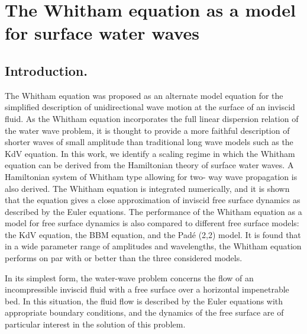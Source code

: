 \section{The Whitham equation as a model for surface water waves}
\subsection{Introduction.}
The Whitham equation was proposed as an alternate model equation for the simplified description of unidirectional 
wave motion at the surface of an inviscid fluid. As the Whitham equation incorporates the full
linear dispersion relation of the water wave problem, it is thought to provide a more faithful description
of shorter waves of small amplitude than traditional long wave models such as the KdV equation.
In this work, we identify a scaling regime in which the Whitham equation can be derived from the
Hamiltonian theory of surface water waves. A Hamiltonian system of Whitham type allowing for two-
way wave propagation is also derived. The Whitham equation is integrated numerically, and it is shown
that the equation gives a close approximation of inviscid free surface dynamics as described by the
Euler equations. The performance of the Whitham equation as a model for free surface dynamics is also
compared to different free surface models: the KdV equation, the BBM equation, and the Pad\'e (2,2) model.
It is found that in a wide parameter range of amplitudes and wavelengths, the Whitham equation performs
on par with or better than the three considered models.


In its simplest form, the water-wave problem concerns the
flow of an incompressible inviscid fluid with a free surface over
a horizontal impenetrable bed. In this situation, the fluid flow
is described by the Euler equations with appropriate boundary
conditions, and the dynamics of the free surface are of particular
interest in the solution of this problem.


